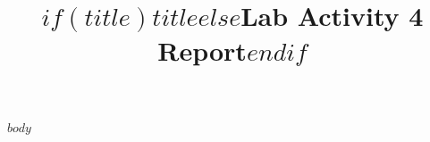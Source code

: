 \documentclass[11pt]{article}
\title{$if(title)$$title$$else$Lab Activity 4 Report$endif$}
\date{}
\begin{document}
\maketitle
$body$
\end{document}
